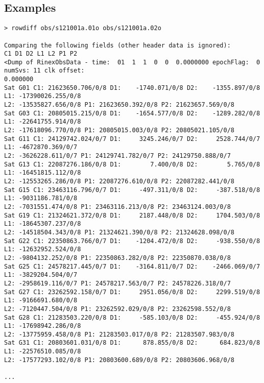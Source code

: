 \subsection{Examples}
\begin{verbatim}
> rowdiff obs/s121001a.01o obs/s121001a.02o

Comparing the following fields (other header data is ignored):
C1 D1 D2 L1 L2 P1 P2 
<Dump of RinexObsData - time:  01  1  1  0  0  0.0000000 epochFlag:  0 numSvs: 11 clk offset: 
0.000000
Sat G01 C1: 21623650.706/0/8 D1:    -1740.071/0/8 D2:    -1355.897/0/8 L1: -17390026.255/0/8 
L2: -13535827.656/0/8 P1: 21623650.392/0/8 P2: 21623657.569/0/8
Sat G03 C1: 20805015.215/0/8 D1:    -1654.577/0/8 D2:    -1289.282/0/8 L1: -22641755.914/0/8 
L2: -17618096.770/0/8 P1: 20805015.003/0/8 P2: 20805021.105/0/8
Sat G11 C1: 24129742.024/0/7 D1:     3245.246/0/7 D2:     2528.744/0/7 L1: -4672870.369/0/7 
L2: -3626228.611/0/7 P1: 24129741.782/0/7 P2: 24129750.888/0/7
Sat G13 C1: 22087276.186/0/8 D1:        7.400/0/8 D2:        5.765/0/8 L1: -16451815.112/0/8 
L2: -12553265.286/0/8 P1: 22087276.610/0/8 P2: 22087282.441/0/8
Sat G15 C1: 23463116.796/0/7 D1:     -497.311/0/8 D2:     -387.518/0/8 L1: -9031186.781/0/8 
L2: -7031551.474/0/8 P1: 23463116.213/0/8 P2: 23463124.003/0/8
Sat G19 C1: 21324621.372/0/8 D1:     2187.448/0/8 D2:     1704.503/0/8 L1: -18645307.237/0/8 
L2: -14518504.343/0/8 P1: 21324621.390/0/8 P2: 21324628.098/0/8
Sat G22 C1: 22350863.766/0/7 D1:    -1204.472/0/8 D2:     -938.550/0/8 L1: -12632952.524/0/8 
L2: -9804132.252/0/8 P1: 22350863.282/0/8 P2: 22350870.038/0/8
Sat G25 C1: 24578217.445/0/7 D1:    -3164.811/0/7 D2:    -2466.069/0/7 L1: -3829204.504/0/7 
L2: -2958619.116/0/7 P1: 24578217.563/0/7 P2: 24578226.318/0/7
Sat G27 C1: 23262592.158/0/7 D1:     2951.056/0/8 D2:     2299.519/0/8 L1: -9166691.680/0/8 
L2: -7120447.504/0/8 P1: 23262592.029/0/8 P2: 23262598.552/0/8
Sat G28 C1: 21283503.220/0/8 D1:     -585.103/0/8 D2:     -455.924/0/8 L1: -17698942.286/0/8 
L2: -13775959.458/0/8 P1: 21283503.017/0/8 P2: 21283507.983/0/8
Sat G31 C1: 20803601.031/0/8 D1:      878.855/0/8 D2:      684.823/0/8 L1: -22576510.085/0/8 
L2: -17577293.102/0/8 P1: 20803600.689/0/8 P2: 20803606.968/0/8

...


\end{verbatim}
